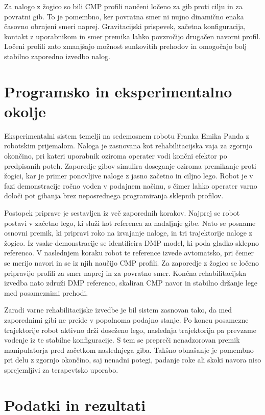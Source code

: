 \documentclass[a4paper]{article}
\begin{document}
Za nalogo z žogico so bili CMP profili naučeni ločeno za gib proti cilju in za
povratni gib. To je pomembno, ker povratna smer ni nujno dinamično enaka
časovno obrnjeni smeri naprej. Gravitacijski prispevek, začetna konfiguracija,
kontakt z uporabnikom in smer premika lahko povzročijo drugačen navorni profil.
Ločeni profili zato zmanjšajo možnost sunkovitih prehodov in omogočajo bolj
stabilno zaporedno izvedbo nalog.

\section{Programsko in eksperimentalno okolje}

Eksperimentalni sistem temelji na sedemosnem robotu Franka Emika Panda z
robotskim prijemalom. Naloga je zasnovana kot rehabilitacijska vaja za zgornjo
okončino, pri kateri uporabnik oziroma operater vodi končni efektor po
predpisanih poteh. Zaporedje gibov simulira doseganje oziroma premikanje proti
žogici, kar je primer ponovljive naloge z jasno začetno in ciljno lego. Robot je
v fazi demonstracije ročno voden v podajnem načinu, s čimer lahko operater
varno določi pot gibanja brez neposrednega programiranja sklepnih profilov.

Postopek priprave je sestavljen iz več zaporednih korakov. Najprej se robot
postavi v začetno lego, ki služi kot referenca za nadaljnje gibe. Nato se
posname osnovni premik, ki pripravi roko na izvajanje naloge, in tri
trajektorije naloge z žogico. Iz vsake demonstracije se identificira DMP model,
ki poda gladko sklepno referenco. V naslednjem koraku robot te reference izvede
avtomatsko, pri čemer se merijo navori in se iz njih naučijo CMP profili. Za
zaporedje z žogico se ločeno pripravijo profili za smer naprej in za povratno
smer. Končna rehabilitacijska izvedba nato združi DMP referenco, skaliran CMP
navor in stabilno držanje lege med posameznimi prehodi.

Zaradi varne rehabilitacijske izvedbe je bil sistem zasnovan tako, da med
zaporednimi gibi ne preide v popolnoma podajno stanje. Po koncu posamezne
trajektorije robot aktivno drži doseženo lego, naslednja trajektorija pa prevzame
vodenje iz te stabilne konfiguracije. S tem se prepreči nenadzorovan premik
manipulatorja pred začetkom naslednjega giba. Takšno obnašanje je pomembno pri
delu z zgornjo okončino, saj nenadni potegi, padanje roke ali skoki navora niso
sprejemljivi za terapevtsko uporabo.

\section{Podatki in rezultati}
\end{document}
